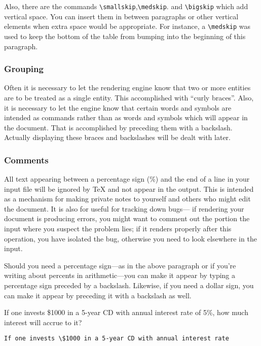 Also, there are the commands  \texttt{\textbackslash smallskip},\texttt{\textbackslash medskip}. and \texttt{\textbackslash bigskip} which add vertical space.  You can insert them in between paragraphs or other vertical elements when extra space would be appropriate.  For instance, a \texttt{\textbackslash medskip} was used to keep the bottom of the table from bumping into the beginning of this paragraph.

\subsubsection{Grouping}

Often it is necessary to let the rendering engine know that two or more entities are to be treated as a single entity. This accomplished with ``curly braces''. Also, it is necessary to let the engine know that certain words and symbols are intended as commands rather than as words and symbols which will appear in the document.  That is accomplished by preceding them with a backslash. Actually displaying these braces and backslashes will be dealt with later.

\subsubsection{Comments}

All text appearing between a percentage sign (\%) and the end of a line in your input file will be ignored by \TeX{} and not appear in the output.  This is intended as a mechanism for making private notes to yourself and others who might edit the document.  It is also for useful for tracking down bugs--- if rendering your document is producing errors, you might want to comment out the portion the input where you suspect the problem lies; if it renders properly after this operation, you have isolated the bug, otherwise you need to look elsewhere in the input.

Should you need a percentage sign---as in the above paragraph or if you're writing about percents in arithmetic---you can make it appear by typing a percentage sign preceded by a backslash.  Likewise, if you need a dollar sign, you can make it appear by preceding it with a backslash as well.
 
\medskip

If one invests \$1000 in a 5-year CD with annual interest rate of 5\%, how much interest will accrue to it?

\smallskip

\verb=If one invests \$1000 in a 5-year CD with annual interest rate=

